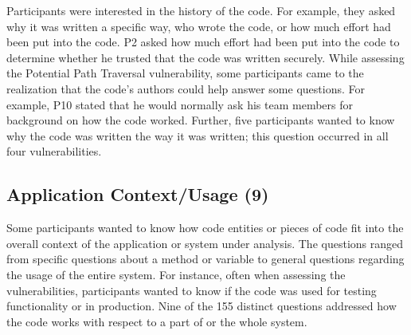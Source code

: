 \documentclass[conference]{IEEEtran}
\begin{document}
Participants were interested in the history of the code.
For example, they asked why it was written a specific way, who wrote the code, or how much effort had been put into the code.
P2 asked how much effort had been put into the code to determine whether he trusted that the code was written securely.
While assessing the Potential Path Traversal vulnerability, some participants came to the realization that the code's authors could help answer some questions. 
For example, P10 stated that he would normally ask his team members for background on how the code worked.
Further, five participants wanted to know why the code was written the way it was written; this question occurred in all four vulnerabilities.
\\



% 


\noindent\subsection{\textbf{Application Context/Usage (9)}}\label{acu}


Some participants wanted to know how code entities or pieces of code fit into the overall context of the application or system under analysis. 
The questions ranged from specific questions about a method or variable to general questions regarding the usage of the entire system. 
For instance, often when assessing the vulnerabilities, participants wanted to know if the code was used for testing functionality or in production. 
Nine of the 155 distinct questions addressed how the code works with respect to a part of or the whole system.
\\
\end{document}
